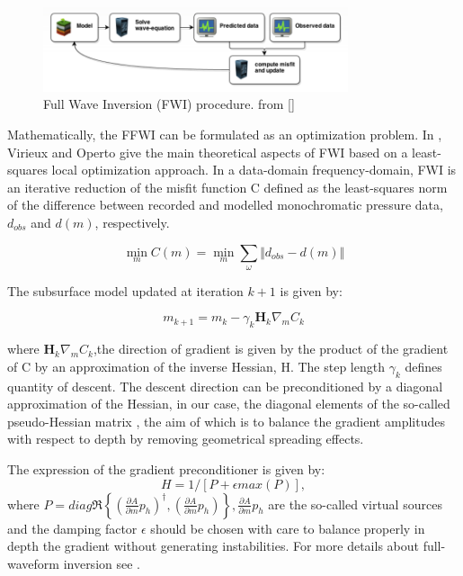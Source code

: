 \begin{figure}[!h]
\centering 
\includegraphics[width=0.8\textwidth]{images/FFWI.png}
\caption{Full Wave Inversion (FWI) procedure. from []}
\label{FWI} 
\end{figure}

Mathematically, the FFWI can be formulated as an optimization problem. In \cite{Virieux2009}, Virieux and Operto give the main theoretical aspects of FWI based on a least-squares local optimization approach. In a data-domain frequency-domain, FWI is an iterative reduction of the misfit function C defined as the least-squares norm of the difference between recorded and modelled monochromatic pressure data, $ d_{obs} $ and $ d(m)$, respectively.

$$ \min_{m} C(m) = \min_{m} \sum_{\omega} \Vert d_{obs} - d(m) \Vert $$

The subsurface model updated at iteration $ k + 1 $ is given by:

$$ m_{k+1} = m_{k} - \gamma_{k} \mathbf{H}_{k} \nabla_{m} C_{k} $$

where $ \mathbf{H}_{k} \nabla_{m} C_{k} $,the direction of gradient is given by the product of the gradient of C by an approximation of the inverse Hessian, H. The step length $ \gamma_{k} $ defines  quantity of descent. The descent direction can be preconditioned by a diagonal approximation of the Hessian, in our case, the diagonal elements of the so-called pseudo-Hessian matrix \cite{Shin2001}, the aim of which is to balance the gradient amplitudes with respect to depth by removing geometrical spreading effects. 

The expression of the gradient preconditioner is given by:
\begin{equation}
H = 1/ [P + \epsilon max(P)],
\end{equation}
where $P = diag \Re \left\lbrace (\frac{\partial A}{\partial m}p_h)^{\dagger}, (\frac{\partial A}{\partial m}p_h)\right\rbrace, \frac{\partial A}{\partial m}p_h$ are the so-called virtual sources  \cite{Pratt1998} and the
damping factor $\epsilon$ should be chosen with care to balance properly in depth the gradient without generating
instabilities. For more details about full-waveform inversion see \cite{Virieux2009}.

